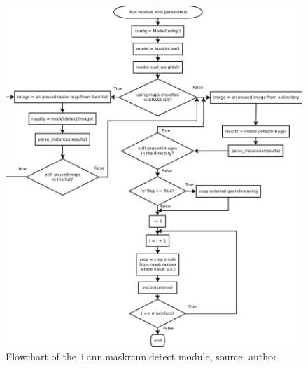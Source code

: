 \begin{figure}[H]
   \centering
	\includegraphics[width=\linewidth]{./pictures/detect_dia.png}
	\caption[i.ann.maskrcnn.detect flowchart]{Flowchart of the~i.ann.maskrcnn.detect module, source: author}
      \label{fig:detect}
\end{figure}

